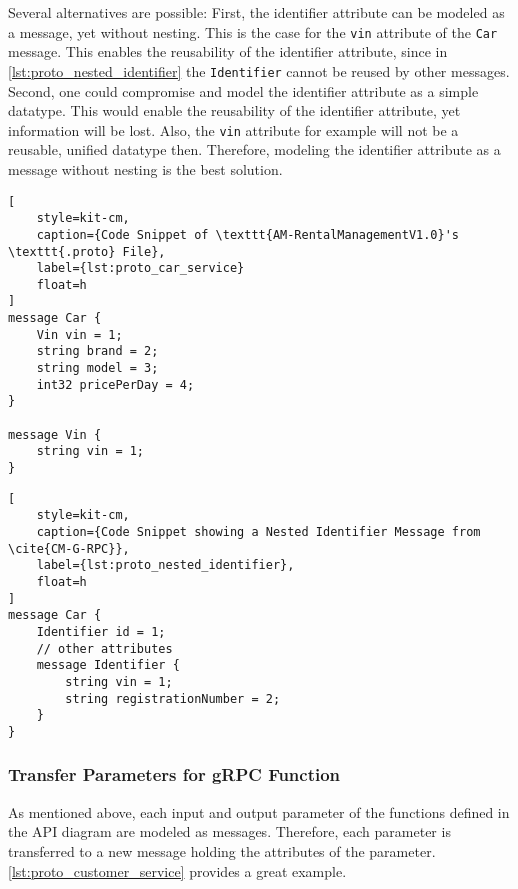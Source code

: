 Several alternatives are possible:
First, the identifier attribute can be modeled as a message, yet without nesting.
This is the case for the \texttt{vin} attribute of the \texttt{Car} message.
This enables the reusability of the identifier attribute, since in \autoref{lst:proto_nested_identifier} the \texttt{Identifier} cannot be reused by other messages.
Second, one could compromise and model the identifier attribute as a simple datatype.
This would enable the reusability of the identifier attribute, yet information will be lost.
Also, the \texttt{vin} attribute for example will not be a reusable, unified datatype then.
Therefore, modeling the identifier attribute as a message without nesting is the best solution.

\begin{lstlisting}[
    style=kit-cm,
    caption={Code Snippet of \texttt{AM-RentalManagementV1.0}'s \texttt{.proto} File},
    label={lst:proto_car_service}
    float=h
]
message Car {
    Vin vin = 1;
    string brand = 2;
    string model = 3;
    int32 pricePerDay = 4;
}

message Vin {
    string vin = 1;
}
\end{lstlisting}

\begin{lstlisting}[
    style=kit-cm,
    caption={Code Snippet showing a Nested Identifier Message from \cite{CM-G-RPC}},
    label={lst:proto_nested_identifier},
    float=h
]
message Car {
    Identifier id = 1;
    // other attributes
    message Identifier {
        string vin = 1;
        string registrationNumber = 2;
    }
}
\end{lstlisting}

\subsubsection*{Transfer Parameters for gRPC Function}
As mentioned above, each input and output parameter of the functions defined in the API diagram are modeled as messages.
Therefore, each parameter is transferred to a new message holding the attributes of the parameter.
\autoref{lst:proto_customer_service} provides a great example.

